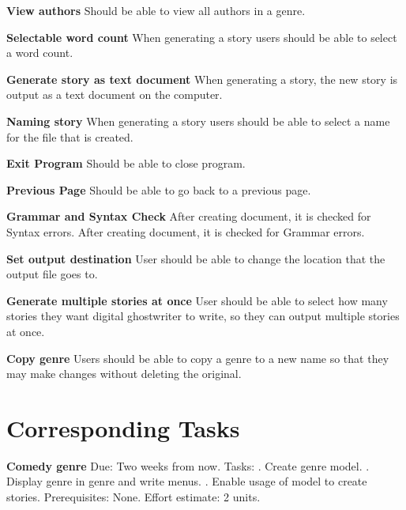 \documentclass[12pt]{article}
\begin{document}
\textbf{View authors}\newline
Should be able to view all authors in a genre.

\textbf{Selectable word count}\newline
When generating a story users should be able to select a word count.

\textbf{Generate story as text document}\newline
When generating a story, the new story is output as a text document on the computer.

\textbf{Naming story}\newline
When generating a story users should be able to select a name for the file that is created.

\textbf{Exit Program}\newline
Should be able to close program.

\textbf{Previous Page}\newline
Should be able to go back to a previous page.

\textbf{Grammar and Syntax Check}\newline
After creating document, it is checked for Syntax errors.
After creating document, it is checked for Grammar errors.
 
\textbf{Set output destination}\newline
User should be able to change the location that the output file goes to.

\textbf{Generate multiple stories at once}\newline
User should be able to select how many stories they want digital ghostwriter to write, so they can output multiple stories at once.

\textbf{Copy genre}\newline
Users should be able to copy a genre to a new name so that they may make changes without deleting the original.

\newpage

\section{Corresponding Tasks}

\textbf{Comedy genre}\newline
Due: Two weeks from now.
\newline
Tasks: 
. Create genre model.
. Display genre in genre and write menus.
. Enable usage of model to create stories.
\newline
Prerequisites: None.
\newline
Effort estimate: 2 units. 
\end{document}
